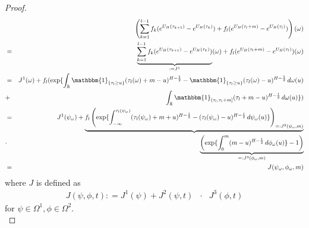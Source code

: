 \documentclass[a4paper, twoside, 11pt]{article}
\theoremstyle{definition}
\newcommand{\brkt}[1]{\left({#1} \right)}
\begin{document}
\begin{proof}
\begin{eqnarray*}
  &&\brkt{\sum_{k=1}^{l-1} f_k (e^{U_H(\tau_{k+1})}  - e^{U_H(\tau_{k})}) + f_l(e^{U_H(\tau_l+m)}-e^{U_H(\tau_l)})} (\omega)  \\
  &=& \underbrace{\sum_{k=1}^{l-1} f_k (e^{U_H(\tau_{k+1})} - e^{U_H(\tau_{k})})}_{:=J^1} (\omega) + f_l(e^{U_H(\tau_l+m)}-e^{U_H(\tau_l)}) (\omega) \\
  &=& J^1(\omega) + f_l(\exp\{\int_{\mathbb{R}}\mathbbm{1}_{\{\tau_l\ge u\}}(\tau_l(\omega)+m-u)^{H-\frac{1}{2}}-\mathbbm{1}_{\{\tau_l\ge u\}}(\tau_l(\omega)-u)^{H-\frac{1}{2}}\mathop{d\omega(u)}\\
&+& \int_{\mathbb{R}} \mathbbm{1}_{(\tau_l, \tau_l+m]}(\tau_l+m - u)^{H-\frac{1}{2}}\mathop{d\omega(u)}\})\\
&=&  J^1(\psi_{\omega}) + \underbrace{f_l\brkt{\exp\{\int_{-\infty}^{\tau_l(\psi_{\omega})}(\tau_l(\psi_{\omega})+m+u)^{H-\frac{1}{2}}-(\tau_l(\psi_{\omega})-u)^{H-\frac{1}{2}}\mathop{d\psi_{\omega}(u)}\}}_{=:J^2(\psi_{\omega}, m)}}\\
&\cdot&  \underbrace{\brkt{\exp\{\int_0^{m}(m-u)^{H-\frac{1}{2}}\mathop{d \phi_{\omega}(u)}\} - 1}}_{=:J^3(\phi_{\omega}, m)}\\
  &=& J(\psi_{\omega}, \phi_{\omega}, m)
\end{eqnarray*}
where $J$ is defined as
\begin{eqnarray*}
  J(\psi, \phi, t) : = J^1(\psi) + J^2(\psi, t)  &\cdot&  J^3(\phi, t)
\end{eqnarray*}
for $\psi\in\Omega^1, \phi\in\Omega^2$.\\


\end{proof}
\end{document}
